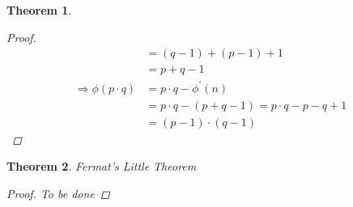 \documentclass{article}
\newtheorem{theorem}{Theorem}
\begin{document}
\begin{theorem}
\begin{proof}
\begin{align*}
                                        & = (q-1) + (p-1) + 1                                                                                                                                                              \\&= p + q - 1                                                                                                                                                  \\
            \Rightarrow \phi(p \cdot q) & = p\cdot q - \phi^{'}(n)                                                                                                                                                         \\&= p \cdot q - (p + q - 1) = p \cdot q - p - q + 1                                                                                                        \\
                                        & = (p-1) \cdot (q-1)
        \end{align*}

    \end{proof}
\end{theorem}

\begin{theorem}
    Fermat's Little Theorem
    \begin{proof}
        To be done
    \end{proof}
\end{theorem}
\end{document}
